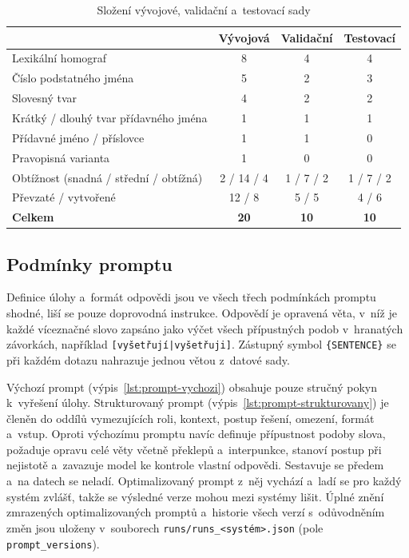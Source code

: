 \documentclass[11pt,a4paper]{article}
\begin{document}
\begin{table}[htbp]
\centering
\small
\caption{Složení vývojové, validační a~testovací sady}
\label{tab:sady}
\begin{tabular}{@{}lccc@{}}
\toprule
 & Vývojová & Validační & Testovací \\
\midrule
Lexikální homograf                     & 8  & 4  & 4  \\
Číslo podstatného jména                & 5  & 2  & 3  \\
Slovesný tvar                          & 4  & 2  & 2  \\
Krátký / dlouhý tvar přídavného jména  & 1  & 1  & 1  \\
Přídavné jméno / příslovce             & 1  & 1  & 0  \\
Pravopisná varianta                    & 1  & 0  & 0  \\
\midrule
Obtížnost (snadná / střední / obtížná) & 2 / 14 / 4 & 1 / 7 / 2 & 1 / 7 / 2 \\
Převzaté / vytvořené                   & 12 / 8 & 5 / 5 & 4 / 6 \\
\midrule
\textbf{Celkem}                        & \textbf{20} & \textbf{10} & \textbf{10} \\
\bottomrule
\end{tabular}
\end{table}

\subsection{Podmínky promptu}
\label{sec:prompty}

Definice úlohy a~formát odpovědi jsou ve všech třech podmínkách promptu
shodné, liší se pouze doprovodná instrukce. Odpovědí je opravená věta,
v~níž je každé víceznačné slovo zapsáno jako výčet všech přípustných
podob v~hranatých závorkách, například \texttt{[vyšetřují|vyšetřuji]}.
Zástupný symbol \texttt{\{SENTENCE\}} se při každém dotazu nahrazuje
jednou větou z~datové sady.

Výchozí prompt (výpis~\ref{lst:prompt-vychozi}) obsahuje pouze stručný
pokyn k~vyřešení úlohy. Strukturovaný prompt
(výpis~\ref{lst:prompt-strukturovany}) je členěn do oddílů vymezujících
roli, kontext, postup řešení, omezení, formát a~vstup. Oproti výchozímu
promptu navíc definuje přípustnost podoby slova, požaduje opravu celé
věty včetně překlepů a~interpunkce, stanoví postup při nejistotě
a~zavazuje model ke kontrole vlastní odpovědi. Sestavuje se předem
a~na datech se neladí. Optimalizovaný prompt z~něj vychází a~ladí se
pro každý systém zvlášť, takže se výsledné verze mohou mezi systémy
lišit. Úplné znění zmrazených optimalizovaných promptů a~historie všech
verzí s~odůvodněním změn jsou uloženy v~souborech
\texttt{runs/runs\_<systém>.json} (pole \texttt{prompt\_versions}).
\end{document}
